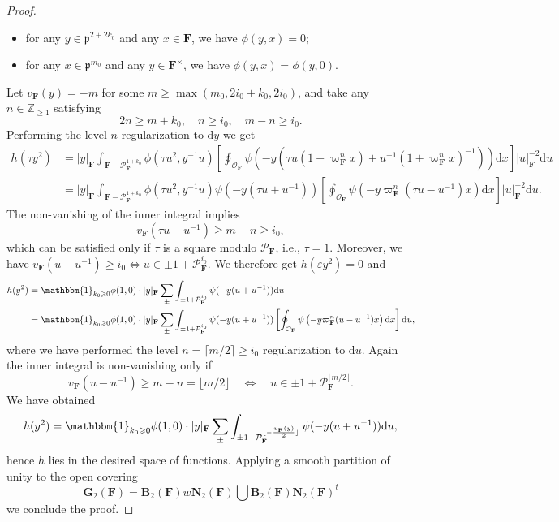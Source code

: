 \documentclass[A4]{amsart}
\def\geq{\geqslant}
\numberwithin{equation}{section} \everymath{\displaystyle}
\newcommand{\gp}[1]{\mathbf{#1}}
\newcommand{\Z}{\mathbb{Z}}
\newcommand{\id}{\mathbbm{1}}
\newcommand{\ud}{\mathrm{d}}
\newcommand{\F}{\mathbf{F}}
\newcommand{\vO}{\mathcal{O}}
\newcommand{\vP}{\mathcal{P}}
\newcommand{\vp}{\mathfrak{p}}
\newcommand{\norm}[1][\cdot]{\lvert #1 \rvert}
\begin{document}
\begin{proof}
\begin{itemize}
	\item for any $y \in \vp^{2+2k_0}$ and any $x \in \F$, we have $\phi(y,x) = 0$;
	\item for any $x \in \vp^{m_0}$ and any $y \in \F^{\times}$, we have $\phi(y,x) = \phi(y,0)$.
\end{itemize}
	Let $v_{\F}(y) = -m$ for some $m \geq \max(m_0, 2i_0+k_0, 2i_0)$, and take any $n \in \Z_{\geq 1}$ satisfying
	$$ 2n \geq m+k_0, \quad n \geq i_0, \quad m-n \geq i_0. $$
	Performing the level $n$ regularization to $\ud y$ we get
\begin{align*}
	h(\tau y^2) &= \norm[y]_{\F} \int_{\F-\vP_{\F}^{1+k_0}} \phi(\tau u^2, y^{-1}u) \left[ \oint_{\vO_{\F}} \psi \left( -y \left( \tau u(1+\varpi_{\F}^n x) + u^{-1}(1+\varpi_{\F}^n x)^{-1} \right) \right) \ud x \right] \norm[u]_{\F}^{-2} \ud u \\
	&= \norm[y]_{\F} \int_{\F-\vP_{\F}^{1+k_0}} \phi(\tau u^2, y^{-1}u) \psi(-y(\tau u + u^{-1})) \left[ \oint_{\vO_{\F}} \psi \left( -y \varpi_{\F}^n (\tau u - u^{-1}) x \right) \ud x \right] \norm[u]_{\F}^{-2} \ud u.
\end{align*}
	The non-vanishing of the inner integral implies
	$$ v_{\F}(\tau u - u^{-1}) \geq m-n \geq i_0, $$
which can be satisfied only if $\tau$ is a square modulo $\vP_{\F}$, i.e., $\tau = 1$. Moreover, we have $v_{\F}(u-u^{-1}) \geq i_0 \Leftrightarrow u \in \pm 1 + \vP_{\F}^{i_0}$. We therefore get $h(\varepsilon y^2) = 0$ and
\begin{align*} 
	h(y^2) &= \id_{k_0 \geq 0} \phi(1, 0) \cdot \norm[y]_{\F} \sum_{\pm} \int_{\pm 1 + \vP_{\F}^{i_0}} \psi(-y(u + u^{-1})) \ud u \\
	&= \id_{k_0 \geq 0} \phi(1, 0) \cdot \norm[y]_{\F} \sum_{\pm} \int_{\pm 1 + \vP_{\F}^{i_0}} \psi(-y(u + u^{-1})) \left[ \oint_{\vO_{\F}} \psi \left( -y \varpi_{\F}^n (u - u^{-1}) x \right) \ud x \right] \ud u,
\end{align*}
where we have performed the level $n = \lceil m/2 \rceil \geq i_0$ regularization to $\ud u$. Again the inner integral is non-vanishing only if
	$$ v_{\F}(u - u^{-1}) \geq m-n = \lfloor m/2 \rfloor \quad \Leftrightarrow \quad u \in \pm 1 + \vP_{\F}^{\lfloor m/2 \rfloor}. $$
	We have obtained
	$$ h(y^2) = \id_{k_0 \geq 0} \phi(1, 0) \cdot \norm[y]_{\F} \sum_{\pm} \int_{\pm 1 + \vP_{\F}^{\lfloor -\frac{v_{\F}(y)}{2} \rfloor}} \psi(-y(u + u^{-1})) \ud u, $$
	hence $h$ lies in the desired space of functions. Applying a smooth partition of unity to the open covering 
	$$ \gp{G}_2(\F) = \gp{B}_2(\F) w \gp{N}_2(\F) \bigcup \gp{B}_2(\F) \gp{N}_2(\F)^t $$
	we conclude the proof.
\end{proof}
\end{document}
